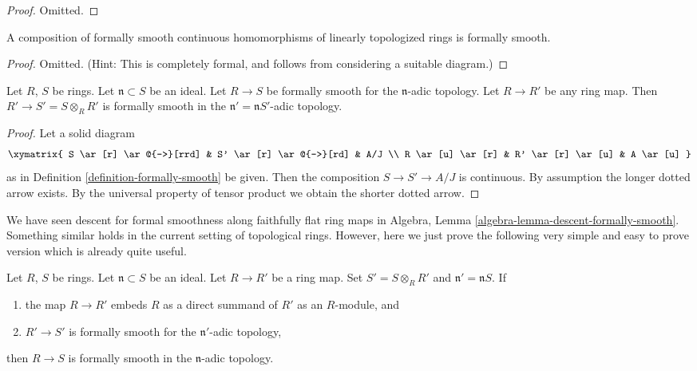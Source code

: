 \begin{proof}
Omitted.
\end{proof}

\begin{lemma}
\label{lemma-compose-formally-smooth}
A composition of formally smooth continuous homomorphisms of linearly
topologized rings is formally smooth.
\end{lemma}

\begin{proof}
Omitted. (Hint: This is completely formal, and follows from considering
a suitable diagram.)
\end{proof}

\begin{lemma}
\label{lemma-base-change-fs}
Let $R$, $S$ be rings. Let $\mathfrak n \subset S$ be an ideal.
Let $R \to S$ be formally smooth for the $\mathfrak n$-adic topology.
Let $R \to R'$ be any ring map. Then $R' \to S' = S \otimes_R R'$
is formally smooth in the $\mathfrak n' = \mathfrak nS'$-adic
topology.
\end{lemma}

\begin{proof}
Let a solid diagram
$$
\xymatrix{
S \ar[r] \ar@{-->}[rrd] & S' \ar[r] \ar@{-->}[rd] & A/J \\
R  \ar[u] \ar[r] & R' \ar[r] \ar[u] & A \ar[u]
}
$$
as in Definition \ref{definition-formally-smooth} be given.
Then the composition $S \to S' \to A/J$ is continuous.
By assumption the longer dotted arrow exists. By the universal
property of tensor product we obtain the shorter dotted arrow.
\end{proof}

\noindent
We have seen descent for formal smoothness along faithfully flat ring
maps in Algebra, Lemma \ref{algebra-lemma-descent-formally-smooth}.
Something similar holds in the current setting of topological rings.
However, here we just prove the following very simple and easy to prove
version which is already quite useful.

\begin{lemma}
\label{lemma-descent-fs}
Let $R$, $S$ be rings. Let $\mathfrak n \subset S$ be an ideal.
Let $R \to R'$ be a ring map. Set $S' = S \otimes_R R'$ and
$\mathfrak n' = \mathfrak nS$. If
\begin{enumerate}
\item the map $R \to R'$ embeds $R$ as a direct summand of $R'$
as an $R$-module, and
\item $R' \to S'$ is formally smooth for the $\mathfrak n'$-adic topology,
\end{enumerate}
then $R \to S$ is formally smooth in the $\mathfrak n$-adic topology.
\end{lemma}

